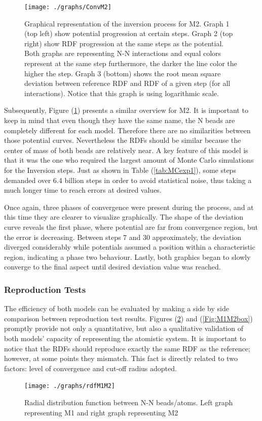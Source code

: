 \documentclass[10pt,a4paper,twoside]{article}
\begin{document}
\begin{figure}[H]
  \begin{center}
	\texttt{[image: ./graphs/ConvM2]}
	\caption{\small{Graphical representation of the inversion process for M2. Graph 1 (top left) show potential progression at certain steps. Graph 2 (top right) show RDF progression at the same steps as the potential. Both graphs are representing N-N interactions and equal colors represent at the same step furthermore, the darker the line color the higher the step. Graph 3 (bottom) shows the root mean square deviation between reference RDF and RDF of a given step (for all interactions). Notice that this graph is using logarithmic scale.}}
	\label{Fig:convM2}
  \end{center}
\end{figure} 

Subsequently, Figure (\ref{Fig:convM2}) presents a similar overview for M2. It is important to keep in mind that even though they have the same name, the N beads are completely different for each model. Therefore there are no similarities between those potential curves. Nevertheless the RDFs should be similar because the center of mass of both beads are relatively near. A key feature of this model is that it was the one who required the largest amount of Monte Carlo simulations for the Inversion steps. Just as shown in Table (\ref{tab:MCexp1}), some steps demanded over 6.4 billion steps in order to avoid statistical noise, thus taking a much longer time to reach errors at desired values.
 
	Once again, three phases of convergence were present during the process, and at this time they are clearer to visualize graphically. The shape of the deviation curve reveals the first phase, where potential are far from convergence region, but the error is decreasing. Between 
steps 7 and 30 approximately, the deviation diverged considerably while potentials assumed a position within a characteristic region, indicating a phase two behaviour. Lastly, both graphics began to slowly converge to the final aspect until desired deviation value was reached.

\subsubsection{Reproduction Tests}
 The efficiency of both models can be evaluated by making a side by side comparison between reproduction test results. Figures (\ref{Fig:M1M2rdf}) and (\ref{Fig:M1M2box}) promptly provide not only a quantitative, but also a qualitative validation of both models' capacity of representing the atomistic system. It is important to notice that the RDFs should reproduce exactly the same RDF as the reference; however, at some points they mismatch. This fact is directly related to two factors: level of convergence and cut-off radius adopted.
     \begin{figure}[ht!]
  \begin{center}
	\texttt{[image: ./graphs/rdfM1M2]}
	\caption{Radial distribution function between N-N beads/atoms. Left graph representing M1 and right graph representing M2}
	\label{Fig:M1M2rdf}
  \end{center}
\end{figure} 
\end{document}
